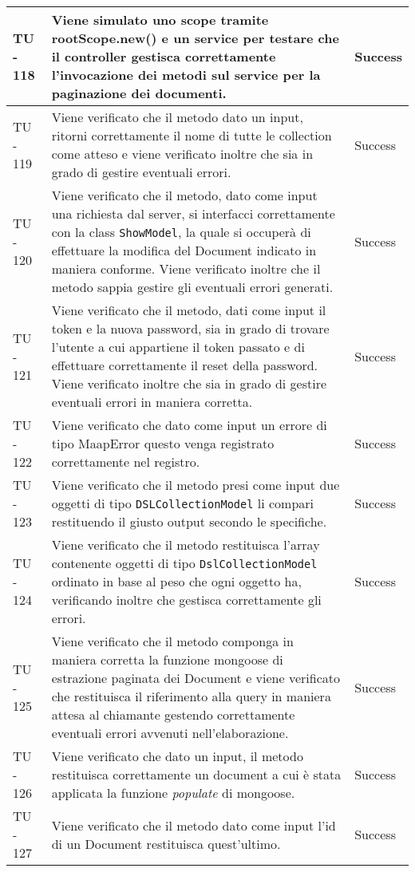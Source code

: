 \begin{center}
\begin{longtable}{ | p{3cm} | p{9cm} | p{2cm} | }
TU - 118 & Viene simulato uno scope tramite rootScope.new() e un service per testare che il controller gestisca correttamente l'invocazione dei metodi sul service per la paginazione dei documenti. & Success \\ \hline
TU - 119 & Viene verificato che il metodo dato un input,  ritorni correttamente il nome di tutte le collection come atteso e viene verificato inoltre che sia in grado di gestire eventuali errori.  & Success \\ \hline
TU - 120 & Viene verificato che il metodo, dato come input una richiesta dal server, si interfacci correttamente con la class \texttt{ShowModel}, la quale si occuperà di effettuare la modifica del Document indicato in maniera conforme. Viene verificato inoltre che il metodo sappia gestire gli eventuali errori generati. & Success \\ \hline
TU - 121 & Viene verificato che il metodo, dati come input il token e la nuova password, sia in grado di trovare l'utente a cui appartiene il token passato e di effettuare correttamente il reset della password.
Viene verificato inoltre che sia in grado di gestire eventuali errori in maniera corretta. & Success \\ \hline
TU - 122 & Viene verificato che dato come input un errore di tipo MaapError questo venga registrato correttamente nel registro. & Success \\ \hline
TU - 123 & Viene verificato che il metodo presi come input due oggetti di tipo \texttt{DSLCollectionModel} li compari restituendo il giusto output secondo le specifiche. & Success \\ \hline
TU - 124 & Viene verificato che il metodo restituisca l'array contenente oggetti di tipo \texttt{DslCollectionModel} ordinato in base al peso che ogni oggetto ha, verificando inoltre che gestisca correttamente gli errori. & Success \\ \hline
TU - 125 & Viene verificato che il metodo componga in maniera corretta la funzione mongoose di estrazione paginata dei Document e viene verificato che restituisca il riferimento alla query in maniera attesa al chiamante gestendo correttamente eventuali errori avvenuti nell'elaborazione. & Success \\ \hline
TU - 126 & Viene verificato che dato un input, il metodo restituisca correttamente un document a cui è stata applicata la funzione \textit{populate} di mongoose.  & Success \\ \hline
TU - 127 & Viene verificato che il metodo dato come input l'id di un Document restituisca quest'ultimo. & Success \\ \hline

\end{longtable}
\end{center}
